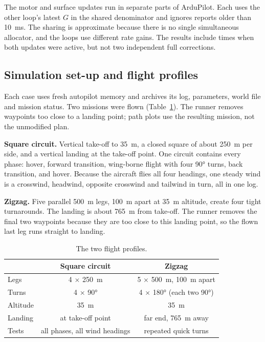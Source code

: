 \documentclass{article}
\begin{document}
The motor and surface updates run in separate parts of ArduPilot. Each uses the other loop's latest $G$ in the shared denominator and ignores reports older than \SI{10}{\milli\second}. The sharing is approximate because there is no single simultaneous allocator, and the loops use different rate gains. The results include times when both updates were active, but not two independent full corrections.

\subsection{Simulation set-up and flight profiles}
\label{sec:sim-to-real}
\label{sec:mission-profile}
Each case uses fresh autopilot memory and archives its log, parameters, world file and mission status. Two missions were flown (Table~\ref{tab:profiles}). The runner removes waypoints too close to a landing point; path plots use the resulting mission, not the unmodified plan.

\textbf{Square circuit.} Vertical take-off to \SI{35}{\meter}, a closed square of about \SI{250}{\meter} per side, and a vertical landing at the take-off point. One circuit contains every phase: hover, forward transition, wing-borne flight with four \ang{90} turns, back transition, and hover. Because the aircraft flies all four headings, one steady wind is a crosswind, headwind, opposite crosswind and tailwind in turn, all in one log.

\textbf{Zigzag.} Five parallel \SI{500}{\meter} legs, \SI{100}{\meter} apart at \SI{35}{\meter} altitude, create four tight turnarounds. The landing is about \SI{765}{\meter} from take-off. The runner removes the final two waypoints because they are too close to this landing point, so the flown last leg runs straight to landing.

\begin{table}[H]
\centering
\caption{The two flight profiles.}
\label{tab:profiles}
\begin{tabular}{lcc}
\hline
 & Square circuit & Zigzag \\
\hline
Legs & 4 $\times$ \SI{250}{\meter} & 5 $\times$ \SI{500}{\meter}, \SI{100}{\meter} apart \\
\hline
Turns & 4 $\times$ \ang{90} & 4 $\times$ \ang{180} (each two \ang{90}) \\
\hline
Altitude & \SI{35}{\meter} & \SI{35}{\meter} \\
\hline
Landing & at take-off point & far end, \SI{765}{\meter} away \\
\hline
Tests & all phases, all wind headings & repeated quick turns \\
\hline
\end{tabular}
\end{table}
\end{document}
